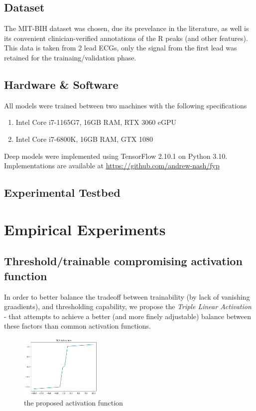 \documentclass[9pt,conference]{IEEEtran}
\begin{document}
\subsection{Dataset}
The MIT-BIH dataset\cite{dataset} was chosen, due its prevelance in the literature, as well is its convenient clinician-verified annotations of the R peaks (and other features). This data is taken from 2 lead ECGs, only the signal from the first lead was retained for the trainaing/validation phase.

\subsection{Hardware \& Software}
All models were trained between two machines with the following specifications

\begin{enumerate}
    \item  Intel Core i7-1165G7, 16GB RAM, RTX 3060 eGPU
    \item  Intel Core i7-6800K, 16GB RAM, GTX 1080
\end{enumerate}

Deep models were implemented using TensorFlow 2.10.1 on Python 3.10. Implementations are available at \url{https://github.com/andrew-nash/fyp}

\subsection{Experimental Testbed}

\section{Empirical Experiments}
\subsection{Threshold/trainable compromising activation function}
In order to better balance the tradeoff between trainability (by lack of vanishing graadients), and thresholding capability, we propose the \textit{Triple Linear Activation} - that attempts to achieve a better (and more finely adjustable) balance between these factors than common activation functions.

\begin{figure}
    \centering
    \includegraphics[width=0.35\textwidth]{tlaAct.png}
    \caption{the proposed activation function}
\end{figure}
\end{document}
